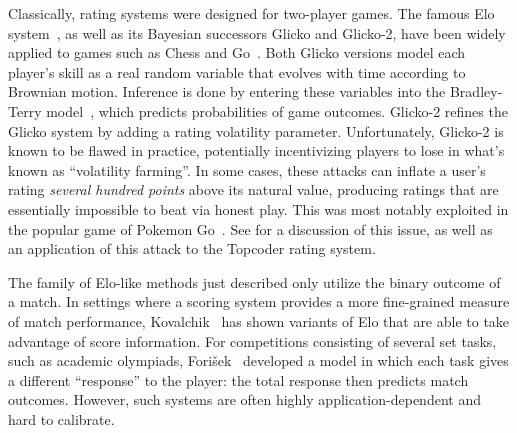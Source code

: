 
Classically, rating systems were designed for two-player games. The famous Elo system~\cite{E61}, as well as its Bayesian successors Glicko and Glicko-2, have been widely applied to games such as Chess and Go~\cite{G95, G99, G12}. Both Glicko versions model each player's skill as a real random variable that evolves with time according to Brownian motion. Inference is done by entering these variables into the Bradley-Terry model~\cite{BT52}, which predicts probabilities of game outcomes. Glicko-2 refines the Glicko system by adding a rating volatility parameter. Unfortunately, Glicko-2 is known to be flawed in practice, potentially incentivizing players to lose in what's known as ``volatility farming''. In some cases, these attacks can inflate a user's rating \emph{several hundred points} above its natural value, producing ratings that are essentially impossible to beat via honest play. This was most notably exploited in the popular game of Pokemon Go~\cite{pokemongo}. See  for a discussion of this issue, as well as an application of this attack to the Topcoder rating system.

The family of Elo-like methods just described only utilize the binary outcome of a match. In settings where a scoring system provides a more fine-grained measure of match performance, Kovalchik~\cite{K20} has shown variants of Elo that are able to take advantage of score information. For competitions consisting of several set tasks, such as academic olympiads, Fori{\v{s}}ek~\cite{forivsektheoretical} developed a model in which each task gives a different ``response'' to the player: the total response then predicts match outcomes. However, such systems are often highly application-dependent and hard to calibrate.



